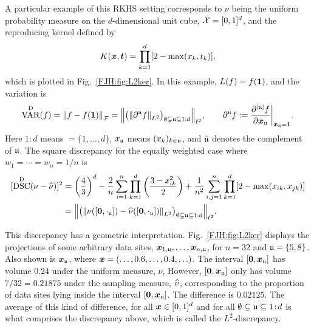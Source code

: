 \documentclass[graybox,footinfo]{svmult}
\DeclareMathOperator{\disc}{DSC}
\DeclareMathOperator{\Var}{VAR}
\begin{document}
A particular example of this RKHS setting corresponds to 
$\nu$ being the uniform probability measure on the $d$-dimensional unit cube, ${\mathcal{X}} 
= 
[0,1]^d$, and the reproducing kernel defined by \cite{Hic97a}
\begin{equation} \label{FJH:eq:L2Kdef}
K(\bsx,\bst) =\prod_{k = 1}^d [2 - \max(x_k,t_k)],
\end{equation}
which is plotted in Fig.\ \ref{FJH:fig:L2ker}.  In this example, $L(f) = f({\boldsymbol{1}})$, and the 
variation is 
\begin{equation*}
\Var^\Dt(f)  = \norm{f-f(\bsone)}_\calF = \Bigl \lVert \bigl ( \norm{\partial^\fraku 
f}_{L^2}\bigr 
)_{\emptyset \subsetneq \fraku \subseteq 1:d} \Bigr \rVert_{\ell^2} , \qquad 
\partial^\fraku f : = \frac{\partial^{\lvert\fraku\rvert} f}{\partial \bsx_\fraku} \biggr 
\rvert_{\bsx_{\bar{\fraku}} = \bsone}.
\end{equation*}
Here $1\!:\!d$ means  $= \{1, \ldots, d\}$, $x_{\mathfrak{u}}$ means $(x_k)_{k \in {\mathfrak{u}}}$, and 
$\bar{{\mathfrak{u}}}$ 
denotes the complement of ${\mathfrak{u}}$.  
The square discrepancy for the equally weighted case where $w_1 = \cdots = w_n = 1/n$ 
is
\begin{align}
\nonumber
[\disc^\Dt(\nu - \hnu)]^2  &= \left(\frac 43\right)^d - \frac{2}n \sum_{i=1}^n \prod_{k=1}^d 
\left (\frac{3 - x_{ik}^2}{2} \right) + \frac{1}{n^2}\sum_{i,j=1}^n \prod_{k = 1}^d [2 - 
\max(x_{ik},x_{jk})] 
\\ &= \Bigl \lVert \bigl ( \norm{\nu([\bszero,\cdot_\fraku]) - 
	\hnu([\bszero,\cdot_\fraku])}_{L^2}\bigr )_{\emptyset \subsetneq \fraku \subseteq 1:d} 
	\Bigr 
	\rVert_{\ell^2}. \label{FJH:eq:L2disc}
\end{align}

This discrepancy has a geometric interpretation. Fig.\ \ref{FJH:fig:L2ker} displays the 
projections of some arbitrary 
data sites, ${\boldsymbol{x}}_{1,{\mathfrak{u}}}, \ldots, {\boldsymbol{x}}_{n,{\mathfrak{u}}}$, for $n=32$ and ${\mathfrak{u}} = \{5,8\}$.  
Also 
shown is ${\boldsymbol{x}}_{\mathfrak{u}}$, where ${\boldsymbol{x}} = (\ldots, 0.6, \ldots, 0.4, \ldots)$. The interval 
$[{\boldsymbol{0}},{\boldsymbol{x}}_{\mathfrak{u}}]$ has volume $0.24$ under the uniform measure, $\nu$, However, 
$[{\boldsymbol{0}},{\boldsymbol{x}}_{\mathfrak{u}}]$ only has 
volume $7/32 = 0.21875$ under the sampling measure, $\widehat{\nu}$, corresponding to the 
proportion of data sites lying inside the interval $[{\boldsymbol{0}},{\boldsymbol{x}}_{\mathfrak{u}}]$. The difference is 
$0.02125$.  The average of this kind of difference, for all ${\boldsymbol{x}} \in [0,1]^d$ and for all 
$\emptyset \subsetneq {\mathfrak{u}} 
\subseteq 1\!:\!d$ is what comprises the discrepancy above, which is called the 
$L^2$-discrepancy.
\end{document}
